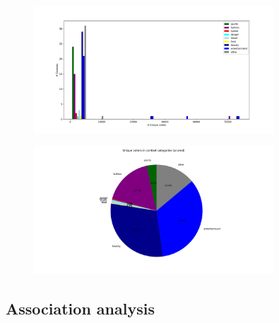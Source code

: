 \begin{figure}[h] 
    \begin{center}
        \includegraphics[width=0.8\textwidth]{Images/user_engagement_in_categories_bar-pruned.png}
        \caption{}
        \label{}
    \end{center}
\end{figure}

\begin{figure}[h] 
    \begin{center}
        \includegraphics[width=0.8\textwidth]{Images/user_engagement_in_categories_pie-pruned.png}
        \caption{}
        \label{}
    \end{center}
\end{figure}


\subsection{Association analysis}

